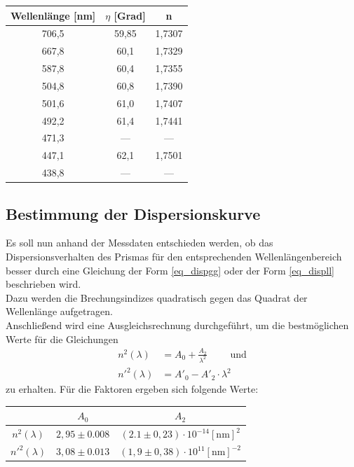 \begin{table}[H]
\begin{tabular}{|c|c|c|}
Wellenlänge [nm] & $\eta$ [Grad] & n \\ \hline
706,5	&59,85	&1,7307 \\ \hline
667,8	&60,1	&1,7329 \\ \hline
587,8	&60,4	&1,7355 \\ \hline
504,8	&60,8	&1,7390 \\ \hline
501,6	&61,0		&1,7407 \\ \hline
492,2	&61,4	&1,7441 \\ \hline
471,3	&---&		---		 \\ \hline
447,1	&62,1&	1,7501 \\ \hline
438,8	&---	&	--- \\ \hline
\end{tabular} 
\end{table}

\subsection{Bestimmung der Dispersionskurve}
Es soll nun anhand der Messdaten entschieden werden, ob das Dispersionsverhalten des Prismas für den entsprechenden Wellenlängenbereich besser durch eine Gleichung der Form \eqref{eq_dispgg} oder der Form \eqref{eq_displl} beschrieben wird.\\
Dazu werden die Brechungsindizes quadratisch gegen das Quadrat der Wellenlänge aufgetragen.\\

Anschließend wird eine Ausgleichsrechnung durchgeführt, um die bestmöglichen Werte für die Gleichungen
\begin{align}
n^2(\lambda) &= A_0 + \frac{A_2}{\lambda^2} \qquad \text{ und}
\label{eq_n^2}\\
n'^2(\lambda) &= A'_0 - A'_2\cdot\lambda^2
\end{align}
zu erhalten.
Für die Faktoren ergeben sich folgende Werte:
\begin{table}[H]
\begin{tabular}{c|c|c}
 & $A_0$ & $A_2$ \\ 
\hline 
$n^2(\lambda)$ &  $2,95 \pm 0.008$ & $(2.1 \pm 0,23)\cdot 10^{-14}[\text{nm}]^2$ \\ 
\hline 
$n'^2(\lambda)$ & $3,08 \pm 0.013$ & $(1,9 \pm 0,38)\cdot 10^{11}[\text{nm}]^{-2}$ \\ 
\hline 
\end{tabular} 
\end{table}


